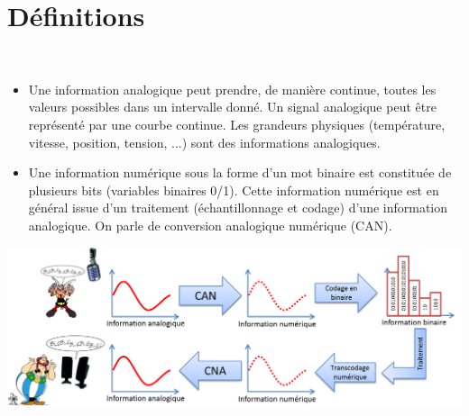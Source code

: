 \documentclass[10pt,fleqn]{article} %
\begin{document}

\vspace{2cm}
\pagestyle{fancy}
\thispagestyle{plain}

\section{Définitions}



\begin{defi} ~\\
\begin{itemize}[label=,font=\color{ocre}] 
\item Une information analogique peut prendre, de manière continue, toutes les valeurs
possibles dans un intervalle donné. Un signal analogique peut être représenté
par une courbe continue. Les grandeurs physiques (température, vitesse,
position, tension, ...) sont des informations analogiques.

\item Une information numérique sous la forme d'un mot binaire est constituée de
plusieurs bits (variables binaires 0/1). Cette information numérique est en
général issue d'un traitement (échantillonnage et codage) d'une information
analogique. On parle de conversion analogique numérique (CAN).
\end{itemize}
\end{defi}

\begin{center}
\includegraphics[width=.8\textwidth]{images/CAN_CNA}

\end{center}
\end{document}
